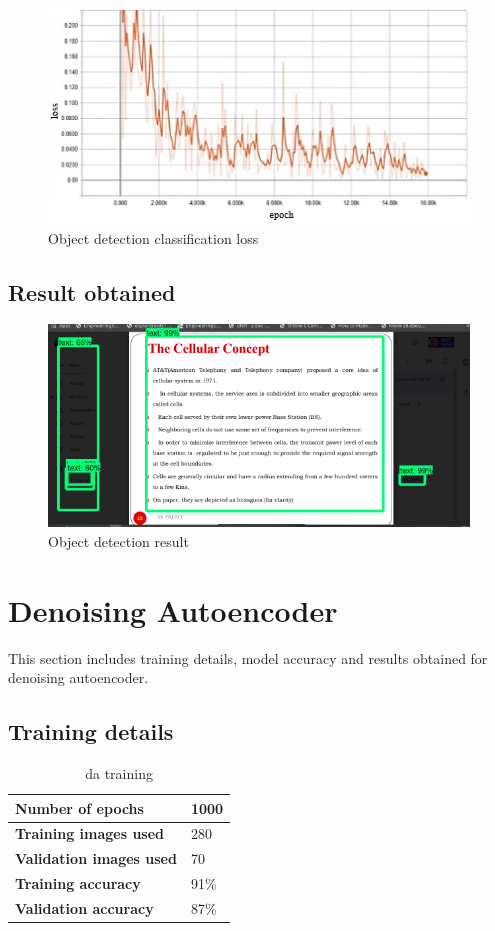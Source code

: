\begin{figure}[H]
\centering
	\includegraphics[scale=1]{Figures/ob_class.png}	
	\caption{Object detection classification loss}
	\label{fig:ob_class}
\end{figure}
\subsection{Result obtained}
\begin{figure}[H]
\centering
	\includegraphics[scale=1]{Figures/detect1.png}	
	\caption{Object detection result}
	\label{fig:detect1}
\end{figure}

\section{Denoising Autoencoder}
This section includes training details, model accuracy and results obtained for denoising autoencoder.
\subsection{Training details}
\begin{table}[H]
\centering
\fontsize{10}{12}\selectfont
\caption{\acrlong{da} training}
\label{c6:tab2}
\small\addtolength{\tabcolsep}{40pt}
\def\arraystretch{1.5}
\begin{tabular}{|p{5cm}|p{2cm}|}
	\hline
	
	\textbf{Number of epochs}   & 1000\\\hline
	\textbf{Training images used}&   280\\\hline
	\textbf{Validation images used} & 70\\\hline
	\textbf{Training accuracy}    &91\%\\\hline
	\textbf{Validation accuracy}&   87\%\\\hline
	\hline
\end{tabular}
\end{table}
